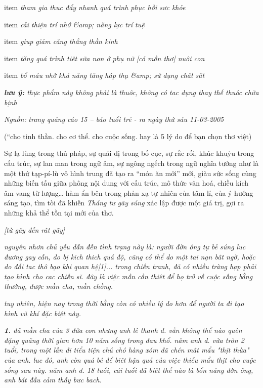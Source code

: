 \documentclass[../main.tex]{subfiles}
\begin{document}
\begin{multicols}{2}
\begin{blockquote}
\begin{blockquote}
\begin{itemize}
item{
\textit{ tham gia thuc đẩy nhanh quá trình phục hồi sưc khỏe } }

item{
\textit{ cải thiện trí nhớ &amp; năng lực trí tuệ } }

item{
\textit{  giup giảm căng thẳng thần kinh } }

item{
\textit{ tăng quá trình tiêt sữa non ở phụ nữ [có mần thơ] nuôi con } }

item{
\textit{ bổ máu nhờ khả năng tăng hâp thụ &amp; sử dụng chât săt } }

\end{itemize}
 \textit{\textbf{lưu ý:} thực phẩm này không phải là thuôc, không có tac dụng thay thế thuôc chữa bịnh} 
 
\textit{Nguồn:} \textit{trang quảng cáo 15 – báo tuổi trẻ - ra ngày thứ sáu 11-03-2005}  
 
(“cho tinh thần. cho cơ thể. cho cuộc sống. hay là 5 lý do để bạn chọn thơ việt) 

\end{blockquote}
 
Sự lạ lùng trong thủ pháp, sự quái dị trong bố cục, sự rắc rối, khúc khuỷu trong cấu trúc, sự lan man trong ngữ âm, sự ngông ngếch trong ngữ nghĩa tưởng như là một thứ tạp-pí-lù vô hình trung đã tạo ra “món ăn mới” mới, giàu sức sống cùng những biến tấu giữa phông nội dung với cấu trúc, mô thức văn hoá, chiều kích âm vang từ lượng… hàm ẩn bên trong phản xạ tự nhiên của tâm lí, của ý hướng sáng tạo, tìm tòi đã khiến \textit{Tháng tư gãy súng} xác lập được một giá trị, gợi ra những khả thể tồn tại mới của thơ.  
\begin{blockquote}
 
\textit{[từ gãy đến rât gãy] } 
 
\textit{nguyên nhơn chủ yếu dẫn đến tình trạng này là: người đờn ông tự bẻ súng luc đương gay cấn, do bị kich thich quá độ, cũng có thể do một tai nạn bât ngờ, hoặc do đối tac thô bạo khi quan hệ[1]... trong chiến tranh, đã có nhiều tràng hạp phải tạo hình cho cac chiến sĩ. đây là việc mần cần thiêt để họ trở về cuộc sống bằng thường, được mần cha, mần chồng. } 
 
\textit{tuy nhiên, hiện nay trong thời bằng còn có nhiều lý do hơn để người ta đi tạo hình vũ khí đặc biệt này. } 
 
\textit{\textbf{1.}  
đã mần cha của 3 đứa con nhưng anh lê thanh d. vẫn không thể nào quên đặng quãng thời gian hơn 10 năm sống trong đau khổ. năm anh d. vừa tròn 2 tuổi, trong một lần đi tiểu tiện chú chó hàng xóm đã chén mât mẩu "thịt thừa" của anh. luc đó, anh còn quá bé để biêt hậu quả của việc thiếu mẩu thịt cho cuộc sống sau này. năm anh d. 18 tuổi, cái tuổi đã biêt thế nào là bổn năng đờn ông, anh băt đầu cảm thấy bưc bach. } 
 

\end{blockquote}
\end{blockquote}
\end{multicols}
\end{document}
